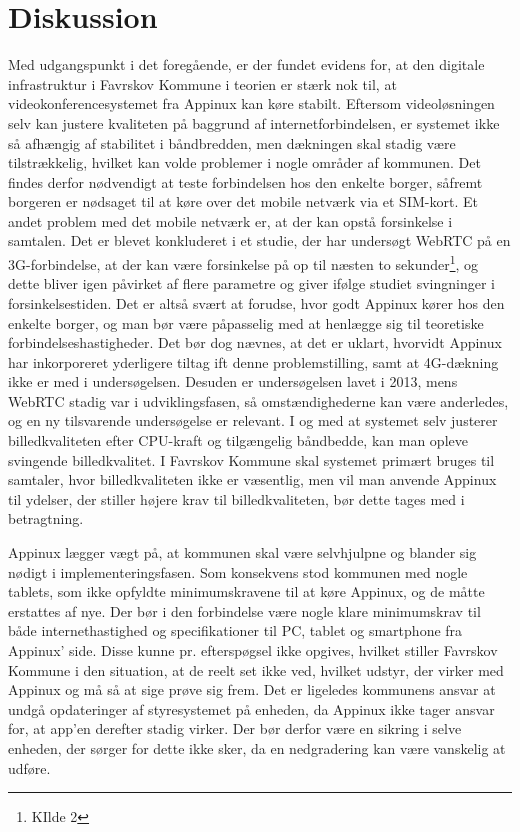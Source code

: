 \section{Diskussion}
Med udgangspunkt i det foregående, er der fundet evidens for, at den digitale infrastruktur i Favrskov Kommune i teorien er stærk nok til, at videokonferencesystemet fra Appinux kan køre stabilt. Eftersom videoløsningen selv kan justere kvaliteten på baggrund af internetforbindelsen, er systemet ikke så afhængig af stabilitet i båndbredden, men dækningen skal stadig være tilstrækkelig, hvilket kan volde problemer i nogle områder af kommunen. Det findes derfor nødvendigt at teste forbindelsen hos den enkelte borger, såfremt borgeren er nødsaget til at køre over det mobile netværk via et SIM-kort. Et andet problem med det mobile netværk er, at der kan opstå forsinkelse i samtalen.
Det er blevet konkluderet i et studie, der har undersøgt WebRTC på en 3G-forbindelse, at der kan være forsinkelse på op til næsten to sekunder\footnote{KIlde 2}, og dette bliver igen påvirket af flere parametre og giver ifølge studiet svingninger i forsinkelsestiden. Det er altså svært at forudse, hvor godt Appinux kører hos den enkelte borger, og man bør være påpasselig med at henlægge sig til teoretiske forbindelseshastigheder. Det bør dog nævnes, at det er uklart, hvorvidt Appinux har inkorporeret yderligere tiltag ift denne problemstilling, samt at 4G-dækning ikke er med i undersøgelsen. Desuden er undersøgelsen lavet i 2013, mens WebRTC stadig var i udviklingsfasen, så omstændighederne kan være anderledes, og en ny tilsvarende undersøgelse er relevant.
I og med at systemet selv justerer billedkvaliteten efter CPU-kraft og tilgængelig båndbedde, kan man opleve svingende billedkvalitet. I Favrskov Kommune skal systemet primært bruges til samtaler, hvor billedkvaliteten ikke er væsentlig, men vil man anvende Appinux til ydelser, der stiller højere krav til billedkvaliteten, bør dette tages med i betragtning.

Appinux lægger vægt på, at kommunen skal være selvhjulpne og blander sig nødigt i implementeringsfasen. Som konsekvens stod kommunen med nogle tablets, som ikke opfyldte minimumskravene til at køre Appinux, og de måtte erstattes af nye. Der bør i den forbindelse være nogle klare minimumskrav til både internethastighed og specifikationer til PC, tablet og smartphone fra Appinux' side. Disse kunne pr. efterspøgsel ikke opgives, hvilket stiller Favrskov Kommune i den situation, at de reelt set ikke ved, hvilket udstyr, der virker med Appinux og må så at sige prøve sig frem. Det er ligeledes kommunens ansvar at undgå opdateringer af styresystemet på enheden, da Appinux ikke tager ansvar for, at app'en derefter stadig virker. Der bør derfor være en sikring i selve enheden, der sørger for dette ikke sker, da en nedgradering kan være vanskelig at udføre.

